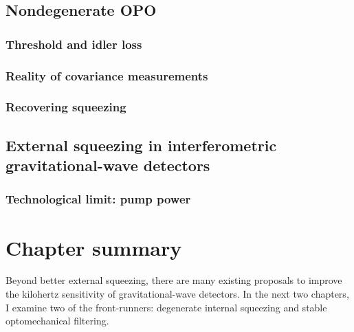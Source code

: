 \subsection{Nondegenerate OPO}

\subsubsection{Threshold and idler loss}

\subsubsection{Reality of covariance measurements}

\subsubsection{Recovering squeezing}

\subsection{External squeezing in interferometric gravitational-wave detectors}


\subsubsection{Technological limit: pump power} 

\section{Chapter summary}

Beyond better external squeezing, there are many  existing proposals to improve the kilohertz sensitivity of gravitational-wave detectors. In the next two chapters, I examine two of the front-runners: degenerate internal squeezing and stable optomechanical filtering.

